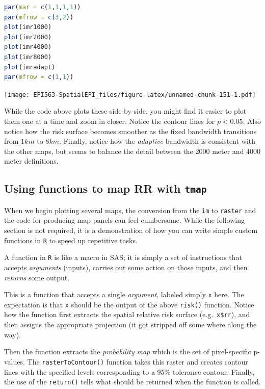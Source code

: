 \documentclass[
]{book}
\newcommand{\passthrough}[1]{#1}
\begin{document}
\begin{lstlisting}[language=R]
par(mar = c(1,1,1,1))
par(mfrow = c(3,2))
plot(imr1000)
plot(imr2000)
plot(imr4000)
plot(imr8000)
plot(imradapt)
par(mfrow = c(1,1))
\end{lstlisting}

\texttt{[image: EPI563-SpatialEPI\_files/figure-latex/unnamed-chunk-151-1.pdf]}

While the code above plots these side-by-side, you might find it easier to plot them one at a time and zoom in closer. Notice the contour lines for \(p<0.05\). Also notice how the risk surface becomes smoother as the fixed bandwidth transitions from \(1km\) to \(8km\). Finally, notice how the \emph{adaptive} bandwidth is consistent with the other maps, but seems to balance the detail between the 2000 meter and 4000 meter definitions.

\hypertarget{using-functions-to-map-rr-with-tmap}{%
\subsection{\texorpdfstring{Using functions to map RR with \texttt{tmap}}{Using functions to map RR with tmap}}\label{using-functions-to-map-rr-with-tmap}}

When we begin plotting several maps, the conversion from the \passthrough{\lstinline!im!} to \passthrough{\lstinline!raster!} and the code for producing map panels can feel cumbersome. While the following section is not required, it is a demonstration of how you can write simple custom functions in \passthrough{\lstinline!R!} to speed up repetitive tasks.

A function in \passthrough{\lstinline!R!} is like a macro in SAS; it is simply a set of instructions that accepts \emph{arguments} (inputs), carries out some action on those inputs, and then \emph{returns} some output.

This is a function that accepts a single \emph{argument}, labeled simply \passthrough{\lstinline!x!} here. The expectation is that \passthrough{\lstinline!x!} should be the output of the above \passthrough{\lstinline!risk()!} function. Notice how the function first extracts the spatial relative risk surface (e.g.~\passthrough{\lstinline!x$rr!}), and then assigns the appropriate projection (it got stripped off some where along the way).

Then the function extracts the \emph{probability map} which is the set of pixel-specific p-values. The \passthrough{\lstinline!rasterToContour()!} function takes this raster and creates contour lines with the specified levels corresponding to a 95\% tolerance contour. Finally, the use of the \passthrough{\lstinline!return()!} tells what should be returned when the function is called.
\end{document}
